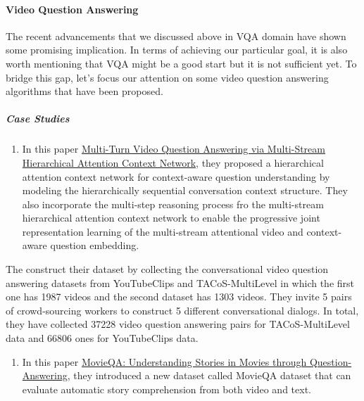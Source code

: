\documentclass[]{book}
\providecommand{\tightlist}{%
  \setlength{\itemsep}{0pt}\setlength{\parskip}{0pt}}
\let\oldparagraph\paragraph
\renewcommand{\paragraph}[1]{\oldparagraph{#1}\mbox{}}
\let\oldsubparagraph\subparagraph
\renewcommand{\subparagraph}[1]{\oldsubparagraph{#1}\mbox{}}
\theoremstyle{definition}
\theoremstyle{definition}
\theoremstyle{definition}
\theoremstyle{remark}
\begin{document}
\paragraph{Video Question Answering}\label{video-question-answering}

The recent advancements that we discussed above in VQA domain have shown
some promising implication. In terms of achieving our particular goal,
it is also worth mentioning that VQA might be a good start but it is not
sufficient yet. To bridge this gap, let's focus our attention on some
video question answering algorithms that have been proposed.

\subparagraph{Case Studies}\label{case-studies-2}

\begin{enumerate}
\def\labelenumi{\arabic{enumi}.}
\tightlist
\item
  In this paper
  \href{https://www.ijcai.org/proceedings/2018/0513.pdf}{Multi-Turn
  Video Question Answering via Multi-Stream Hierarchical Attention
  Context Network}, they proposed a hierarchical attention context
  network for context-aware question understanding by modeling the
  hierarchically sequential conversation context structure. They also
  incorporate the multi-step reasoning process fro the multi-stream
  hierarchical attention context network to enable the progressive joint
  representation learning of the multi-stream attentional video and
  context-aware question embedding.
\end{enumerate}

The construct their dataset by collecting the conversational video
question answering datasets from YouTubeClips and TACoS-MultiLevel in
which the first one has 1987 videos and the second dataset has 1303
videos. They invite 5 pairs of crowd-sourcing workers to construct 5
different conversational dialogs. In total, they have collected 37228
video question answering pairs for TACoS-MultiLevel data and 66806 ones
for YouTubeClips data.

\begin{enumerate}
\def\labelenumi{\arabic{enumi}.}
\setcounter{enumi}{1}
\tightlist
\item
  In this paper \href{https://arxiv.org/pdf/1512.02902.pdf}{MovieQA:
  Understanding Stories in Movies through Question-Answering}, they
  introduced a new dataset called MovieQA dataset that can evaluate
  automatic story comprehension from both video and text.
\end{enumerate}
\end{document}
